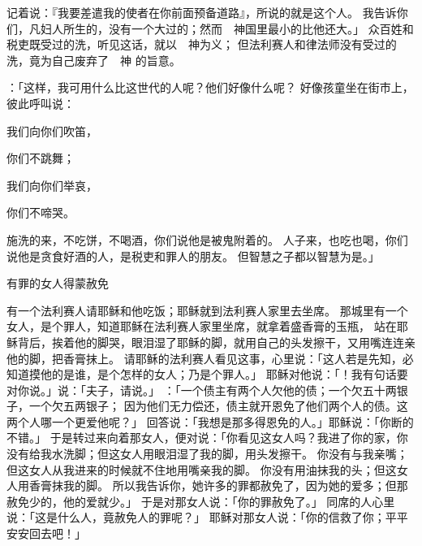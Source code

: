 {记着说：『我要差遣我的使者在你前面预备道路』，所说的就是这个人。
我告诉你们，凡妇人所生的，没有一个大过{}的；然而　神国里最小的比他还大。」
众百姓和税吏既受过{}的洗，听见这话，就以　神为义；
但法利赛人和律法师没有受过{}的洗，竟为自己废弃了　神 的旨意。
\par }{\PP {}：「这样，我可用什么比这世代的人呢？他们好像什么呢？
好像孩童坐在街市上，彼此呼叫说：
\par }{\Q 我们向你们吹笛，
\par }{\Q 你们不跳舞；
\par }{\Q 我们向你们举哀，
\par }{\Q 你们不啼哭。
\par }{\MM {}施洗的{}来，不吃饼，不喝酒，你们说他是被鬼附着的。
人子来，也吃也喝，你们说他是贪食好酒的人，是税吏和罪人的朋友。
但智慧之子都以智慧为是。」
\par }{\SH 有罪的女人得蒙赦免
\par }{\PP {}有一个法利赛人请耶稣和他吃饭；耶稣就到法利赛人家里去坐席。
那城里有一个女人，是个罪人，知道耶稣在法利赛人家里坐席，就拿着盛香膏的玉瓶，
站在耶稣背后，挨着他的脚哭，眼泪湿了耶稣的脚，就用自己的头发擦干，又用嘴连连亲他的脚，把香膏抹上。
请耶稣的法利赛人看见这事，心里说：「这人若是先知，必知道摸他的是谁，是个怎样的女人；乃是个罪人。」
耶稣对他说：「{}！我有句话要对你说。」{}说：「夫子，请说。」
：「一个债主有两个人欠他的债；一个欠五十两银子，一个欠五两银子；
因为他们无力偿还，债主就开恩免了他们两个人的债。这两个人哪一个更爱他呢？」
回答说：「我想是那多得恩免的人。」耶稣说：「你断的不错。」
于是转过来向着那女人，便对{}说：「你看见这女人吗？我进了你的家，你没有给我水洗脚；但这女人用眼泪湿了我的脚，用头发擦干。
你没有与我亲嘴；但这女人从我进来的时候就不住地用嘴亲我的脚。
你没有用油抹我的头；但这女人用香膏抹我的脚。
所以我告诉你，她许多的罪都赦免了，因为她的爱多；但那赦免少的，他的爱就少。」
于是对那女人说：「你的罪赦免了。」
同席的人心里说：「这是什么人，竟赦免人的罪呢？」
耶稣对那女人说：「你的信救了你；平平安安回去吧！」

}
